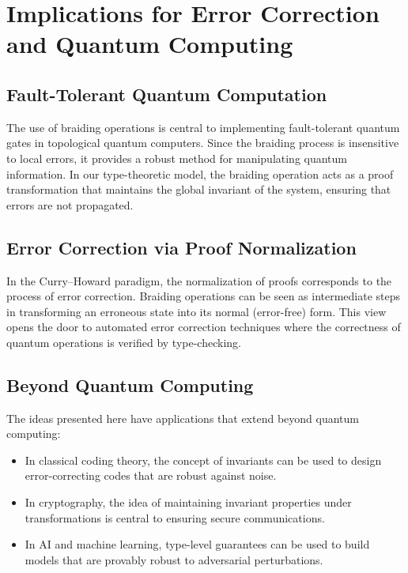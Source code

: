 \documentclass[12pt]{article}
\begin{document}
\section{Implications for Error Correction and Quantum Computing}

\subsection{Fault-Tolerant Quantum Computation}

The use of braiding operations is central to implementing fault-tolerant quantum gates in topological quantum computers. Since the braiding process is insensitive to local errors, it provides a robust method for manipulating quantum information. In our type-theoretic model, the braiding operation acts as a proof transformation that maintains the global invariant of the system, ensuring that errors are not propagated.

\subsection{Error Correction via Proof Normalization}

In the Curry–Howard paradigm, the normalization of proofs corresponds to the process of error correction. Braiding operations can be seen as intermediate steps in transforming an erroneous state into its normal (error-free) form. This view opens the door to automated error correction techniques where the correctness of quantum operations is verified by type-checking.

\subsection{Beyond Quantum Computing}

The ideas presented here have applications that extend beyond quantum computing:
\begin{itemize}
  \item In classical coding theory, the concept of invariants can be used to design error-correcting codes that are robust against noise.
  \item In cryptography, the idea of maintaining invariant properties under transformations is central to ensuring secure communications.
  \item In AI and machine learning, type-level guarantees can be used to build models that are provably robust to adversarial perturbations.
\end{itemize}
\end{document}
